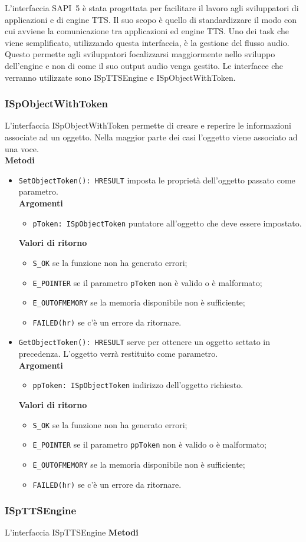 L'interfaccia SAPI~5 è stata progettata per facilitare il lavoro agli sviluppatori di applicazioni e di engine TTS. Il suo scopo è quello di standardizzare il modo con cui avviene la comunicazione tra applicazioni ed engine TTS. Uno dei task che viene semplificato, utilizzando questa interfaccia, è la gestione del flusso audio. Questo permette agli sviluppatori focalizzarsi maggiormente nello sviluppo dell'engine e non di come il suo output audio venga gestito.
Le interfacce che verranno utilizzate sono ISpTTSEngine e ISpObjectWithToken.
     \subsubsection{ISpObjectWithToken}
     L'interfaccia ISpObjectWithToken permette di creare e reperire le informazioni associate ad un oggetto. Nella maggior parte dei casi l'oggetto viene associato ad una voce.\\
     \textbf{Metodi}
     \begin{itemize}
     	\item \texttt{SetObjectToken(): HRESULT} imposta le proprietà dell'oggetto passato come parametro.\\
     	\textbf{Argomenti}
		\begin{itemize}
			\item \texttt{pToken: ISpObjectToken} puntatore all'oggetto che deve essere impostato.
		\end{itemize}
     	\textbf{Valori di ritorno}
		\begin{itemize}
		 	\item \texttt{S\_OK} se la funzione non ha generato errori;
		 	\item \texttt{E\_POINTER} se il parametro \texttt{pToken} non è valido o è malformato;
		 	\item \texttt{E\_OUTOFMEMORY} se la memoria disponibile non è sufficiente;
		 	\item \texttt{FAILED(hr)} se c'è un errore da ritornare. 
		 \end{itemize}
	    
	     \item \texttt{GetObjectToken(): HRESULT} serve per ottenere un oggetto settato in precedenza. L'oggetto verrà restituito come parametro.\\
	     \textbf{Argomenti}
		 \begin{itemize}
		     \item \texttt{ppToken: ISpObjectToken} indirizzo dell'oggetto richiesto.
		 \end{itemize}
	     \textbf{Valori di ritorno}
		 \begin{itemize}
		    \item \texttt{S\_OK} se la funzione non ha generato errori;
		    \item \texttt{E\_POINTER} se il parametro \texttt{ppToken} non è valido o è malformato;
		    \item \texttt{E\_OUTOFMEMORY} se la memoria disponibile non è sufficiente;
	     	\item \texttt{FAILED(hr)} se c'è un errore da ritornare. 
	     \end{itemize}
     \end{itemize}
      
     \subsubsection{ISpTTSEngine}
     L'interfaccia ISpTTSEngine 
     \textbf{Metodi}
   
 